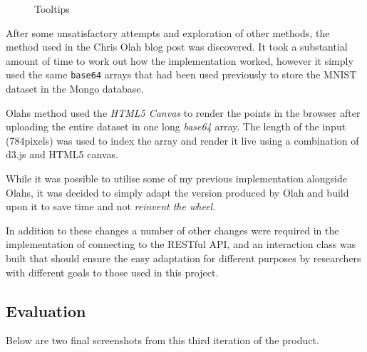 \documentclass[a4paper,11pt,titlepage]{article}
\begin{document}
	\begin{figure}[H]
    			\caption{Tooltips}%
	\end{figure}	
	
	\par 
	After some unsatisfactory attempts and exploration of other methods, the method used in the Chris Olah blog post \cite{Olah2014d} was discovered. It took a substantial amount of time to work out how the implementation worked, however it simply used the same \texttt{base64} arrays that had been used previously to store the MNIST dataset in the Mongo database. 
	\par 
	Olahs method used the \textit{HTML5 Canvas} to render the points in the browser after uploading the entire dataset in one long \textit{base64} array. The length of the input (784pixels) was used to index the array and render it live using a combination of d3.js and HTML5 canvas.
	\par 
	While it was possible to utilise some of my previous implementation alongside Olahs, it was decided to simply adapt the version produced by Olah and build upon it to save time and not \textit{reinvent the wheel}.	
	\par 
	In addition to these changes a number of other changes were required in the implementation of connecting to the RESTful API, and an interaction class was built that should ensure the easy adaptation for different purposes by researchers with different goals to those used in this project.
	
	\subsection{Evaluation}
	Below are two final screenshots from this third iteration of the product. 
	
\end{document}
